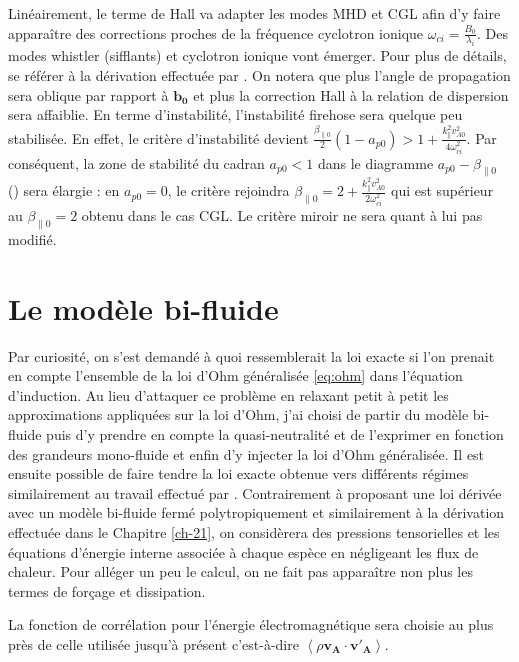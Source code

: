Linéairement, le terme de \acs{Hall} va adapter les modes \ac{MHD} et \acs{CGL} afin d'y faire apparaître des corrections proches de la fréquence cyclotron ionique $\omega_{ci} = \frac{B_0}{\lambda_i}$. Des modes whistler (sifflants) et cyclotron ionique vont émerger. Pour plus de détails, se référer à la dérivation effectuée par \cite{hunana_introductory_2019}. On notera que plus l'angle de propagation sera oblique par rapport à $\boldsymbol{b_0}$ et plus la correction \acs{Hall} à la relation de dispersion sera affaiblie. En terme d'instabilité, l'instabilité firehose sera quelque peu stabilisée. En effet, le critère d'instabilité devient $\frac{\beta_{\parallel 0}}{2}(1- a_{p0} ) > 1+\frac{k_{\parallel}^2 v^2_{A0}}{4\omega^2_{ci}}$. Par conséquent, la zone de stabilité du cadran $a_{p0}<1$ dans le diagramme $a_{p0}-\beta_{\parallel0}$ () sera élargie : en $a_{p0}=0$, le critère rejoindra $\beta_{\parallel 0} = 2+\frac{k_{\parallel}^2 v^2_{A0}}{2\omega^2_{ci}}$ qui est supérieur au $\beta_{\parallel 0} = 2$ obtenu dans le cas \acs{CGL}. Le critère miroir ne sera quant à lui pas modifié. 

\section{Le modèle bi-fluide}
\label{sec-233}

Par curiosité, on s'est demandé à quoi ressemblerait la loi exacte si l'on prenait en compte l'ensemble de la loi d'Ohm généralisée \eqref{eq:ohm} dans l'équation d'induction. Au lieu d'attaquer ce problème en relaxant petit à petit les approximations appliquées sur la loi d'Ohm, j'ai choisi de partir du modèle bi-fluide puis d'y prendre en compte la quasi-neutralité et de l'exprimer en fonction des grandeurs mono-fluide et enfin d'y injecter la loi d'Ohm généralisée. Il est ensuite possible de faire tendre la loi exacte obtenue vers différents régimes similairement au travail effectué par \cite{banerjee_scale--scale_2020}. Contrairement à \cite{banerjee_scale--scale_2020} proposant une loi dérivée avec un modèle bi-fluide fermé polytropiquement et similairement à la dérivation effectuée dans le Chapitre \ref{ch-21}, on considèrera des pressions tensorielles et les équations d'énergie interne associée à chaque espèce en négligeant les flux de chaleur. Pour alléger un peu le calcul, on ne fait pas apparaître non plus les termes de forçage et dissipation.

La fonction de corrélation pour l'énergie électromagnétique sera choisie au plus près de celle utilisée jusqu'à présent c'est-à-dire $\left<\rho \boldsymbol{v_A}\cdot \boldsymbol{v'_A}\right>$.

